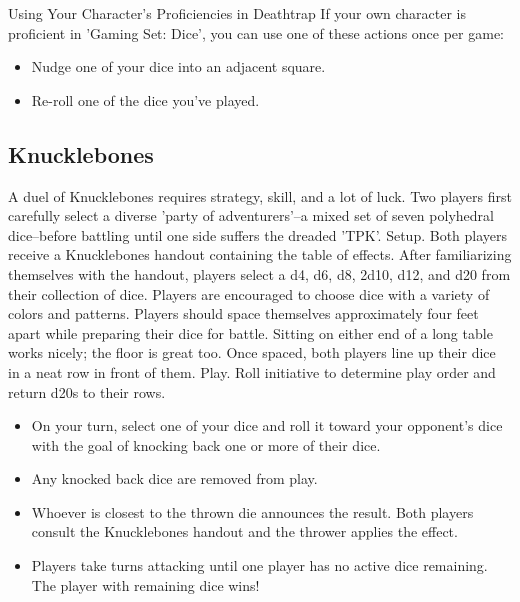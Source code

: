 \documentclass[10pt,a4paper,twoside,twocolumn,openany,bg=print,nodeprecatedcode]{dndbook}
\begin{document}
\begin{DndComment}{Using Your Character's Proficiencies in Deathtrap}
If your own character is proficient in 'Gaming Set: Dice', you can use one of these actions once per game:

\begin{itemize}
\item Nudge one of your dice into an adjacent square.
\item Re-roll one of the dice you've played.
\end{itemize}

\end{DndComment}

\subsection{Knucklebones}
A duel of Knucklebones requires strategy, skill, and a lot of luck. Two players first carefully select a diverse 'party of adventurers'–a mixed set of seven polyhedral dice–before battling until one side suffers the dreaded 'TPK'.
Setup. Both players receive a Knucklebones handout containing the table of effects. After familiarizing themselves with the handout, players select a d4, d6, d8, 2d10, d12, and d20 from their collection of dice. Players are encouraged to choose dice with a variety of colors and patterns.
Players should space themselves approximately four feet apart while preparing their dice for battle. Sitting on either end of a long table works nicely; the floor is great too. Once spaced, both players line up their dice in a neat row in front of them.
Play. Roll initiative to determine play order and return d20s to their rows.

\begin{itemize}
\item On your turn, select one of your dice and roll it toward your opponent's dice with the goal of knocking back one or more of their dice.
\item Any knocked back dice are removed from play.
\item Whoever is closest to the thrown die announces the result. Both players consult the Knucklebones handout and the thrower applies the effect.
\item Players take turns attacking until one player has no active dice remaining. The player with remaining dice wins!
\end{itemize}
\end{document}

